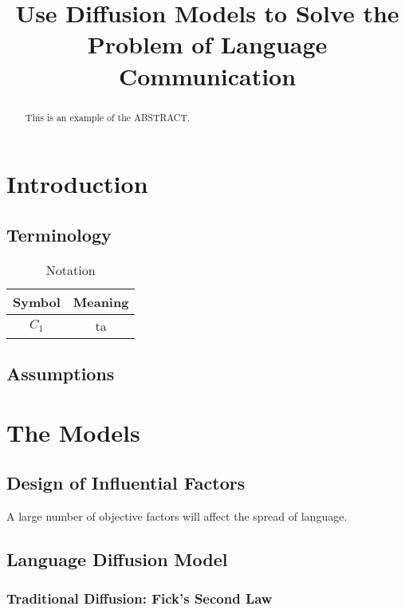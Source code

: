 \documentclass{mcmthesis}
\title{Use Diffusion Models to Solve the Problem of Language Communication}
\begin{document}
  \begin{abstract}
    This is an example of the ABSTRACT.
  \end{abstract}

  \maketitle
  \tableofcontents

  \section{Introduction}%

    \subsection{Terminology}%

    \begin{table}[h]
    \centering
    \caption{Notation}

    \begin{tabular}{cc}
    \toprule
    Symbol&Meaning\\
    \midrule
    {$C_1$}&ta\\
    \bottomrule
    \end{tabular}
  \end{table}
    \subsection{Assumptions}%

  \section{The Models}

    \subsection{Design of Influential Factors}%
    A large number of objective factors will affect the spread of language.
    \subsection{Language Diffusion Model}%
    \subsubsection{Traditional Diffusion: Fick's Second Law}%
\end{document}
